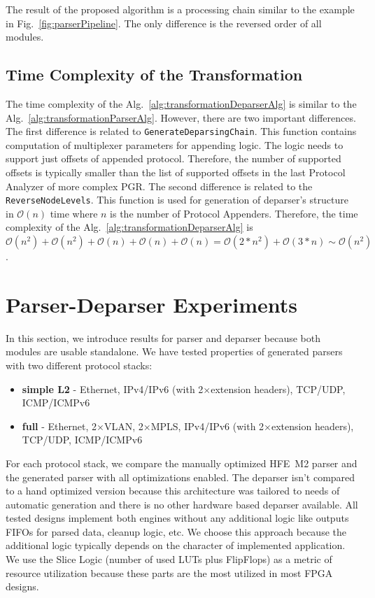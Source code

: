 The result of the proposed algorithm is a processing chain similar to the example in Fig.~\ref{fig:parserPipeline}.
The only difference is the reversed order of all modules. 

\subsection{Time Complexity of the Transformation}
The time complexity of the Alg.~\ref{alg:transformationDeparserAlg} is similar to the Alg.~\ref{alg:transformationParserAlg}.
However, there are two important differences. The first difference is related to \texttt{GenerateDeparsingChain}. 
This function contains computation of multiplexer parameters for appending logic. The logic needs to support just offsets of appended protocol. 
Therefore, the number of supported offsets is typically smaller than the list of supported offsets in the last Protocol Analyzer of 
more complex PGR. 
The second difference is related to the \texttt{ReverseNodeLevels}. 
This function is used for generation of deparser's structure in $\mathcal{O}(n)$ time where $n$ is the number of Protocol Appenders. 
Therefore, the time complexity of the Alg.~\ref{alg:transformationDeparserAlg} is
$\mathcal{O}(n^2)+\mathcal{O}(n^2)+\mathcal{O}(n)+\mathcal{O}(n)+\mathcal{O}(n)=\mathcal{O}(2*n^2)+\mathcal{O}(3*n) \sim \mathcal{O}(n^2)$.

\section{Parser-Deparser Experiments}
In this section, we introduce results for parser and deparser because both modules are usable standalone.
We have tested properties of generated parsers with two different protocol stacks:
\begin{itemize}
    \item \textbf{simple L2} - Ethernet, IPv4/IPv6 (with 2$\times$extension headers), TCP/UDP, \\ ICMP/ICMPv6
    \item \textbf{full} - Ethernet, 2$\times$VLAN, 2$\times$MPLS, IPv4/IPv6 (with 2$\times$extension headers), \\ TCP/UDP, ICMP/ICMPv6
\end{itemize}

For each protocol stack, we compare the manually optimized HFE~M2 parser and the generated parser with all optimizations enabled. The 
deparser isn't compared to a hand optimized version because this architecture was tailored to needs of 
automatic generation and there is no other hardware based deparser available.
All tested designs implement both engines without any additional logic like outputs FIFOs for parsed data, cleanup logic, etc. 
We choose this approach because the additional logic typically depends on the character of implemented application. 
We use the Slice Logic (number of used LUTs plus FlipFlops) as a metric of resource utilization because these parts are the most utilized in 
most FPGA designs.

